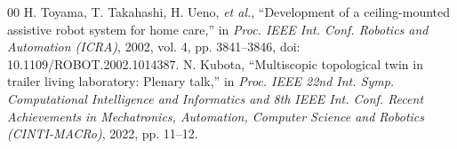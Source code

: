\documentclass[conference]{IEEEtran}
\begin{document}
\begin{thebibliography}{00}
 H. Toyama, T. Takahashi, H. Ueno, \textit{et al.}, ``Development of a ceiling-mounted assistive robot system for home care,'' in \textit{Proc. IEEE Int. Conf. Robotics and Automation (ICRA)}, 2002, vol. 4, pp. 3841--3846, doi: 10.1109/ROBOT.2002.1014387.
 N. Kubota, ``Multiscopic topological twin in trailer living laboratory: Plenary talk,'' in \textit{Proc. IEEE 22nd Int. Symp. Computational Intelligence and Informatics and 8th IEEE Int. Conf. Recent Achievements in Mechatronics, Automation, Computer Science and Robotics (CINTI-MACRo)}, 2022, pp. 11--12.
\end{thebibliography}
\end{document}
